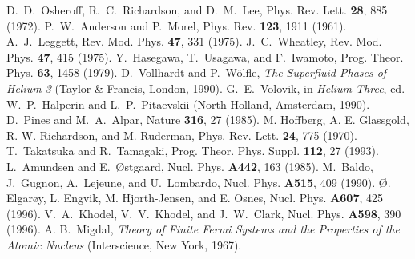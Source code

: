 \begin{references}
D.~D.~Osheroff, R.~C.~Richardson, and D.~M.~Lee, 
Phys. Rev. Lett. {\bf 28}, 885 (1972). 
P.~W.~Anderson and P.~Morel, Phys. Rev. {\bf 123}, 1911 (1961). 
A.~J.~Leggett, Rev. Mod. Phys. {\bf 47}, 331 (1975).
J.~C.~Wheatley, Rev. Mod. Phys. {\bf 47}, 415 (1975). 
Y.~Hasegawa, T.~Usagawa, and F.~Iwamoto, 
Prog. Theor. Phys. {\bf 63}, 1458  (1979).
D.~Vollhardt and P.~W\"olfle, {\it The Superfluid Phases of Helium 3} 
(Taylor \& Francis, London, 1990).
G.~E.~Volovik, in {\it Helium Three}, ed. W.~P.~Halperin
and L.~P.~Pitaevskii (North Holland, Amsterdam, 1990).
D.~Pines and M.~A.~Alpar, Nature {\bf 316}, 27 (1985).
M. Hoffberg, A. E. Glassgold, R. W. Richardson, and
M. Ruderman, Phys. Rev. Lett. {\bf 24}, 775 (1970).
T.~Takatsuka and R.~Tamagaki, 
Prog. Theor. Phys. Suppl. {\bf 112}, 27 (1993). 
L.~Amundsen and E.~\O stgaard, Nucl. Phys. {\bf A442}, 163 (1985). 
M.~Baldo, J.~Gugnon, A.~Lejeune, and U.~Lombardo, 
Nucl. Phys. {\bf A515}, 409 (1990).
{\O}. Elgar{\o}y, L. Engvik, M. Hjorth-Jensen, and E. Osnes,
Nucl. Phys. {\bf A607}, 425 (1996).
V.~A.~Khodel, V.~V.~Khodel, and J.~W.~Clark, 
Nucl. Phys. {\bf A598}, 390 (1996).
A. B.~Migdal, {\it Theory of Finite Fermi Systems and 
the Properties of the Atomic Nucleus} (Interscience, New York, 1967).
\end{references}





